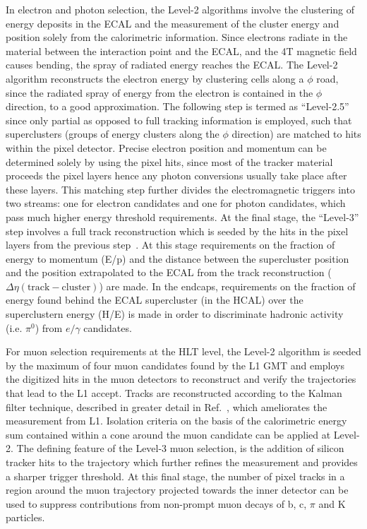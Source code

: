 In electron and photon selection, the Level-2 algorithms involve the clustering of energy deposits in the ECAL and the measurement of the cluster energy and position solely from the calorimetric information. Since electrons radiate in the material between the interaction point and the ECAL, and the 4T magnetic field causes bending, the spray of radiated energy reaches the ECAL. The Level-2 algorithm reconstructs the electron energy by clustering cells along a $\phi$ road, since the radiated spray of energy from the electron is contained in the $\phi$ direction, to a good approximation. The following step is termed as ``Level-2.5'' since only partial as opposed to full tracking information is employed, such that superclusters (groups of energy clusters along the $\phi$ direction) are matched to hits within the pixel detector. Precise electron position and momentum can be determined solely by using the pixel hits, since most of the tracker material proceeds the pixel layers hence any photon conversions usually take place after these layers. This matching step further divides the electromagnetic triggers into two streams: one for electron candidates and one for photon candidates, which pass much higher energy threshold requirements. At the final stage, the ``Level-3'' step involves a full track reconstruction which is seeded by the hits in the pixel layers from the previous step~\cite{}. At this stage requirements on the fraction of energy to momentum (E/p) and the distance between the supercluster position and the position extrapolated to the ECAL from the track reconstruction ($\Delta\eta\mathrm{(track-cluster)}$) are made. In the endcaps, requirements on the fraction of energy found behind the ECAL supercluster (in the HCAL) over the superclustern energy (H/E) is made in order to discriminate hadronic activity (i.e. $\pi^{0}$) from $e/\gamma$ candidates. 

For muon selection requirements at the HLT level, the Level-2 algorithm is seeded by the maximum of four muon candidates found by the L1 GMT and employs the digitized hits in the muon detectors to reconstruct and verify the trajectories that lead to the L1 accept. Tracks are reconstructed according to the Kalman filter technique, described in greater detail in Ref.~\cite{Fruhwirth:1987fm}, which ameliorates the \pt measurement from L1. Isolation criteria on the basis of the calorimetric energy sum contained within a cone around the muon candidate can be applied at Level-2. The defining feature of the Level-3 muon selection, is the addition of silicon tracker hits to the trajectory which further refines the \pt measurement and provides a sharper trigger threshold. At this final stage, the number of pixel tracks in a region around the muon trajectory projected towards the inner detector can be used to suppress contributions from non-prompt muon decays of b, c, $\pi$ and K particles.

